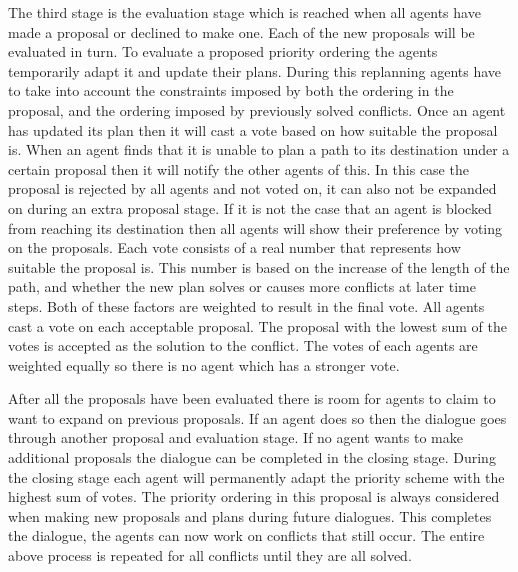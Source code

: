 The third stage is the evaluation stage which is reached when all agents have
made a proposal or declined to make one. Each of the new proposals will be
evaluated in turn. To evaluate a proposed priority ordering the agents 
temporarily adapt it
and update their plans. During this replanning agents have to take into account
the constraints imposed by both the ordering in the proposal, and the ordering
imposed by previously solved conflicts. Once an agent has updated its plan then
it will cast a vote based on how suitable the proposal is. When an agent finds
that it is unable to plan a path to its destination under a certain proposal
then it will notify the other agents of this. In this case the proposal is
rejected by all agents and not voted on, it can also not be expanded on during
an extra proposal stage. If it is not the case that an agent is blocked from
reaching its destination then all agents will show their preference by voting 
on the proposals. Each vote consists of a real number that represents how
suitable the proposal is. This number is based on the increase of the length of
the path, and whether the new plan solves or causes more conflicts at later
time steps. Both of these factors are weighted to result in the final vote. All
agents cast a vote on each acceptable proposal. The proposal with the lowest
sum of the votes is accepted as the solution to the conflict. The votes of each
agents are weighted equally so there is no agent which has a stronger vote.

After all the proposals have been evaluated there is room for agents to claim
to want to expand on previous proposals. If an agent does so then the dialogue
goes through another proposal and evaluation stage. If no agent wants to make
additional proposals the dialogue can be completed in the closing stage. During
the closing stage each agent will permanently adapt the priority scheme with
the highest sum of votes. The priority ordering in this proposal is always
considered when making new proposals and plans during future dialogues. This
completes the dialogue, the agents can now work on conflicts that still occur.
The entire above process is repeated for all conflicts until they are all
solved.

